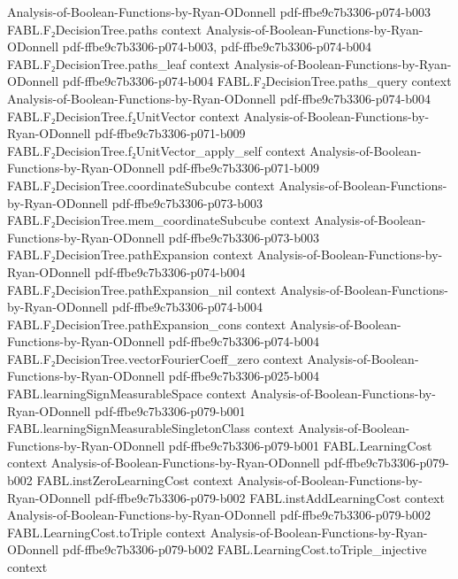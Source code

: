 \begin{theorem}
  {Analysis-of-Boolean-Functions-by-Ryan-ODonnell}
  {pdf-ffbe9c7b3306-p074-b003}
\proofstep
  {FABL.F₂DecisionTree.paths}
  {context}
  {Analysis-of-Boolean-Functions-by-Ryan-ODonnell}
  {pdf-ffbe9c7b3306-p074-b003,
    pdf-ffbe9c7b3306-p074-b004}
\proofstep
  {FABL.F₂DecisionTree.paths_leaf}
  {context}
  {Analysis-of-Boolean-Functions-by-Ryan-ODonnell}
  {pdf-ffbe9c7b3306-p074-b004}
\proofstep
  {FABL.F₂DecisionTree.paths_query}
  {context}
  {Analysis-of-Boolean-Functions-by-Ryan-ODonnell}
  {pdf-ffbe9c7b3306-p074-b004}
\proofstep
  {FABL.F₂DecisionTree.f₂UnitVector}
  {context}
  {Analysis-of-Boolean-Functions-by-Ryan-ODonnell}
  {pdf-ffbe9c7b3306-p071-b009}
\proofstep
  {FABL.F₂DecisionTree.f₂UnitVector_apply_self}
  {context}
  {Analysis-of-Boolean-Functions-by-Ryan-ODonnell}
  {pdf-ffbe9c7b3306-p071-b009}
\proofstep
  {FABL.F₂DecisionTree.coordinateSubcube}
  {context}
  {Analysis-of-Boolean-Functions-by-Ryan-ODonnell}
  {pdf-ffbe9c7b3306-p073-b003}
\proofstep
  {FABL.F₂DecisionTree.mem_coordinateSubcube}
  {context}
  {Analysis-of-Boolean-Functions-by-Ryan-ODonnell}
  {pdf-ffbe9c7b3306-p073-b003}
\proofstep
  {FABL.F₂DecisionTree.pathExpansion}
  {context}
  {Analysis-of-Boolean-Functions-by-Ryan-ODonnell}
  {pdf-ffbe9c7b3306-p074-b004}
\proofstep
  {FABL.F₂DecisionTree.pathExpansion_nil}
  {context}
  {Analysis-of-Boolean-Functions-by-Ryan-ODonnell}
  {pdf-ffbe9c7b3306-p074-b004}
\proofstep
  {FABL.F₂DecisionTree.pathExpansion_cons}
  {context}
  {Analysis-of-Boolean-Functions-by-Ryan-ODonnell}
  {pdf-ffbe9c7b3306-p074-b004}
\proofstep
  {FABL.F₂DecisionTree.vectorFourierCoeff_zero}
  {context}
  {Analysis-of-Boolean-Functions-by-Ryan-ODonnell}
  {pdf-ffbe9c7b3306-p025-b004}
\proofstep
  {FABL.learningSignMeasurableSpace}
  {context}
  {Analysis-of-Boolean-Functions-by-Ryan-ODonnell}
  {pdf-ffbe9c7b3306-p079-b001}
\proofstep
  {FABL.learningSignMeasurableSingletonClass}
  {context}
  {Analysis-of-Boolean-Functions-by-Ryan-ODonnell}
  {pdf-ffbe9c7b3306-p079-b001}
\proofstep
  {FABL.LearningCost}
  {context}
  {Analysis-of-Boolean-Functions-by-Ryan-ODonnell}
  {pdf-ffbe9c7b3306-p079-b002}
\proofstep
  {FABL.instZeroLearningCost}
  {context}
  {Analysis-of-Boolean-Functions-by-Ryan-ODonnell}
  {pdf-ffbe9c7b3306-p079-b002}
\proofstep
  {FABL.instAddLearningCost}
  {context}
  {Analysis-of-Boolean-Functions-by-Ryan-ODonnell}
  {pdf-ffbe9c7b3306-p079-b002}
\proofstep
  {FABL.LearningCost.toTriple}
  {context}
  {Analysis-of-Boolean-Functions-by-Ryan-ODonnell}
  {pdf-ffbe9c7b3306-p079-b002}
\proofstep
  {FABL.LearningCost.toTriple_injective}
  {context}

\end{theorem}
